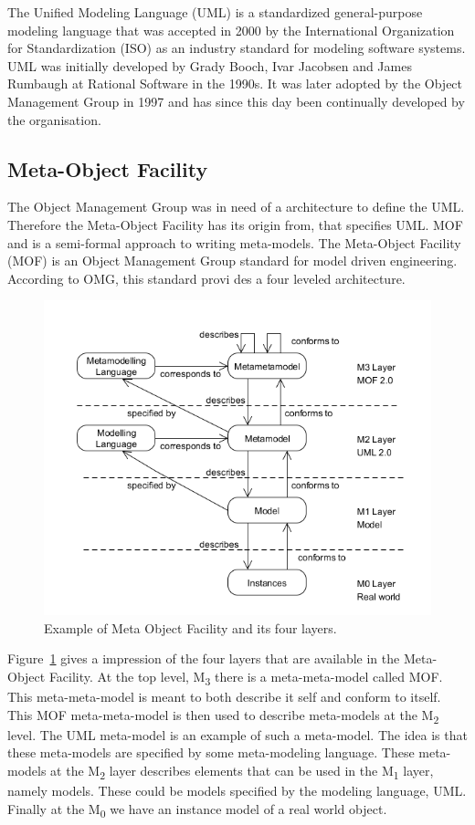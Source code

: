 The Unified Modeling Language\cite{UML,UML_SPEC} (UML) is a standardized
general-purpose modeling language that was accepted in 2000 by the International
Organization for Standardization (ISO) as an industry standard for modeling
software systems. UML was initially developed by Grady Booch, Ivar Jacobsen and
James Rumbaugh at Rational Software in the 1990s. It was later adopted by the
Object Management Group in 1997 and has since this day been continually
developed by the organisation. 

\subsection{Meta-Object Facility}

The Object Management Group was in need of a architecture to define the
UML. Therefore the Meta-Object Facility has its origin from, that specifies UML.
MOF and is a semi-formal approach to writing meta-models. The Meta-Object
Facility\cite{MOF} (MOF) is an Object Management Group standard for model
driven engineering. According to OMG, this standard provi des a four leveled
architecture.

\begin{figure}[H]
	\centering
	\includegraphics[scale=0.6]{./Figures/MOFLayers.png}
	\caption[Meta Object Facility]
	{Example of Meta Object Facility and its four layers.}
	\label{fig:MOFLayers}
\end{figure}

Figure~\ref{fig:MOFLayers} gives a impression of the four layers that are
available in the Meta-Object Facility. At the top level, M\textsubscript{3}
there is a meta-meta-model called MOF. This meta-meta-model is meant to both
describe it self and conform to itself. This MOF meta-meta-model is then used to
describe meta-models at the M\textsubscript{2} level. The UML meta-model is an
example of such a meta-model. The idea is that these meta-models are specified by
some meta-modeling language. These meta-models at the M\textsubscript{2} layer
describes elements that can be used in the M\textsubscript{1} layer, namely
models. These could be models specified by the modeling language, UML. Finally
at the M\textsubscript{0} we have an instance model of a real world object. 


